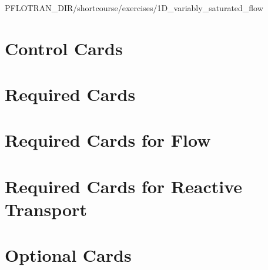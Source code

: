\documentclass{beamer}
\begin{document}
\begin{frame}\frametitle{}
\small
\begin{semiverbatim}
PFLOTRAN_DIR/shortcourse/exercises/1D_variably_saturated_flow
\end{semiverbatim}
\end{frame}

\section{Control Cards}



\section{Required Cards}








\section{Required Cards for Flow}


\section{Required Cards for Reactive Transport}




\section{Optional Cards}



\end{document}
